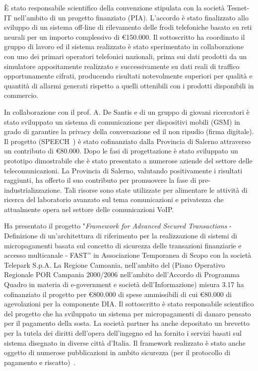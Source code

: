 \documentclass[11pt,a4paper,sans]{moderncv}        %
\begin{document}
{
\`E stato responsabile scientifico della convenzione stipulata con la società Tesnet-IT nell'ambito di un progetto finanziato (PIA). L'accordo è stato finalizzato allo sviluppo di un sistema off-line di rilevamento delle frodi telefoniche basato su reti neurali per un importo complessivo di \euro{150.000}. Il sottoscritto ha coordinato il gruppo di lavoro ed il sistema realizzato è stato sperimentato in collaborazione con uno dei primari operatori telefonici nazionali, prima sui dati prodotti da un simulatore appositamente realizzato e successivamente su dati reali di traffico opportunamente cifrati, producendo risultati notevolmente superiori per qualità e quantità di allarmi generati rispetto a quelli ottenibili con i prodotti disponibili in commercio.
}

{
In collaborazione con il prof. A. De Santis e di un gruppo di giovani ricercatori è stato sviluppato un sistema di comunicazione per dispositivi mobili (GSM) in grado di garantire la  privacy della conversazione ed il non ripudio (firma digitale). Il progetto (SPEECH~\cite{Castiglione2006287}) è stato cofinanziato dalla Provincia di Salerno attraverso un contributo di \euro{80.000}. Dopo le fasi di progettazione è stato sviluppato un prototipo dimostrabile che è stato presentato a numerose aziende del settore delle telecomunicazioni.  La Provincia di Salerno, valutando positivamente i risultati raggiunti, ha offerto il suo contributo per promuovere la fase di pre-industrializzazione. Tali risorse sono state utilizzate per alimentare le attività di ricerca del laboratorio avanzato sul tema comunicazioni e privatezza che attualmente opera nel settore delle comunicazioni VoIP.
}

{
Ha presentato il progetto "{\em Framework for Advanced Secured Transactions} - Definizione di un’architettura di riferimento per la realizzazione di sistemi di micropagamenti  basata sul concetto di sicurezza delle transazioni finanziarie e accesso multicanale - FAST'' in Associazione Temporanea di Scopo con la società Telepark S.p.A.
La Regione Camoania, nell'ambito del (Piano Operativo Regionale POR Campania 2000/2006 nell’ambito dell’Accordo di Programma Quadro in materia di e-government e società dell’Informazione) misura 3.17 ha cofinanziato il progetto per \euro{800.000} di spese ammissibili di cui \euro{80.000} di agevolazioni per la componente DIA. Il sottoscritto è stato responsabile scientifico del progetto che ha sviluppato un sistema per micropagamenti di danaro pensato per il pagamento della sosta. La società partner ha anche depositato un brevetto per la tutela dei diritti dell'opera dell'ingegno ed ha fornito i servizi basati sul sistema disegnato in diverse città d'Italia.
Il framework realizzato è stato anche oggetto di numerose pubblicazioni in ambito sicurezza (per il protocollo di pagamento e riscatto)~\cite{Castiglione200962, DeSantis2010843}.
}
\end{document}
